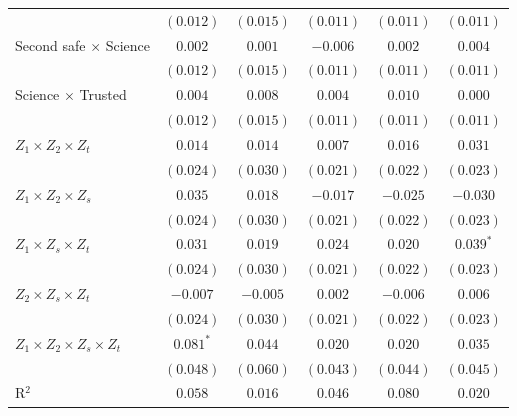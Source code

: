 \begin{table}
\begin{center}
\begin{tabular}{l c c || c c || c}
                                         & $(0.012)$     & $(0.015)$     & $(0.011)$     & $(0.011)$     & $(0.011)$     \\
Second safe $\times$ Science             & $0.002$       & $0.001$       & $-0.006$      & $0.002$       & $0.004$       \\
                                         & $(0.012)$     & $(0.015)$     & $(0.011)$     & $(0.011)$     & $(0.011)$     \\
Science $\times$ Trusted                 & $0.004$       & $0.008$       & $0.004$       & $0.010$       & $0.000$       \\
                                         & $(0.012)$     & $(0.015)$     & $(0.011)$     & $(0.011)$     & $(0.011)$     \\
$Z_1 \times Z_2 \times Z_t$              & $0.014$       & $0.014$       & $0.007$       & $0.016$       & $0.031$       \\
                                         & $(0.024)$     & $(0.030)$     & $(0.021)$     & $(0.022)$     & $(0.023)$     \\
$Z_1 \times Z_2 \times Z_s$              & $0.035$       & $0.018$       & $-0.017$      & $-0.025$      & $-0.030$      \\
                                         & $(0.024)$     & $(0.030)$     & $(0.021)$     & $(0.022)$     & $(0.023)$     \\
$Z_1 \times Z_s \times Z_t$              & $0.031$       & $0.019$       & $0.024$       & $0.020$       & $0.039^{*}$   \\
                                         & $(0.024)$     & $(0.030)$     & $(0.021)$     & $(0.022)$     & $(0.023)$     \\
$Z_2 \times Z_s \times Z_t$              & $-0.007$      & $-0.005$      & $0.002$       & $-0.006$      & $0.006$       \\
                                         & $(0.024)$     & $(0.030)$     & $(0.021)$     & $(0.022)$     & $(0.023)$     \\
$Z_1 \times Z_2 \times Z_s \times Z_t$   & $0.081^{*}$   & $0.044$       & $0.020$       & $0.020$       & $0.035$       \\
                                         & $(0.048)$     & $(0.060)$     & $(0.043)$     & $(0.044)$     & $(0.045)$     \\
\hline
R$^2$                                    & $0.058$       & $0.016$       & $0.046$       & $0.080$       & $0.020$       \\

\end{tabular}
\end{center}
\end{table}
